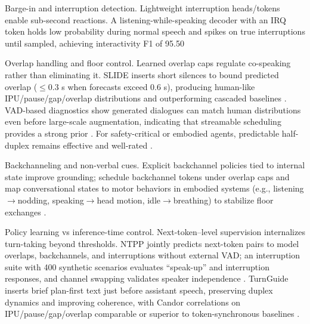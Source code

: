 \documentclass{article}
\begin{document}
Barge-in and interruption detection. Lightweight interruption heads/tokens enable sub-second reactions. A listening-while-speaking decoder with an IRQ token holds low probability during normal speech and spikes on true interruptions until sampled, achieving interactivity F1 of 95.50%

Overlap handling and floor control. Learned overlap caps regulate co-speaking rather than eliminating it. SLIDE inserts short silences to bound predicted overlap ($\leq$0.3 s when forecasts exceed 0.6 s), producing human-like IPU/pause/gap/overlap distributions and outperforming cascaded baselines \cite{lu2025slideintegratingspeechlanguagemodelllmsp}. VAD-based diagnostics show generated dialogues can match human distributions even before large-scale augmentation, indicating that streamable scheduling provides a strong prior \cite{fu2024investigatingeffectslargescalepseudoster}. For safety-critical or embodied agents, predictable half-duplex remains effective and well-rated \cite{fu2025personalizedsociallyassistiverobotsendsp}.

Backchanneling and non-verbal cues. Explicit backchannel policies tied to internal state improve grounding; schedule backchannel tokens under overlap caps and map conversational states to motor behaviors in embodied systems (e.g., listening$\rightarrow$nodding, speaking$\rightarrow$head motion, idle$\rightarrow$breathing) to stabilize floor exchanges \cite{lu2025slideintegratingspeechlanguagemodelllmsp,fu2025personalizedsociallyassistiverobotsendsp}.

Policy learning vs inference-time control. Next-token--level supervision internalizes turn-taking beyond thresholds. NTPP jointly predicts next-token pairs to model overlaps, backchannels, and interruptions without external VAD; an interruption suite with 400 synthetic scenarios evaluates ``speak-up'' and interruption responses, and channel swapping validates speaker independence \cite{wang2025ntppgenerativespeechlanguagemodelingdual}. TurnGuide inserts brief plan-first text just before assistant speech, preserving duplex dynamics and improving coherence, with Candor correlations on IPU/pause/gap/overlap comparable or superior to token-synchronous baselines \cite{cui2025thinkbeforeyoutalkenhancingmeaningfuldia}.
\end{document}
